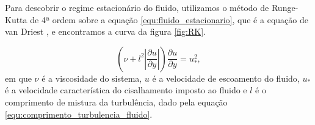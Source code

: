     Para descobrir o regime estacionário do fluido, utilizamos o método de Runge-Kutta de 4ª ordem sobre a equação \ref{equ:fluido_estacionario}, que é a equação de van Driest \cite{Numerical_simulation_of_turbulent_sediment_transport}, e encontramos a curva da figura \ref{fig:RK}.

\begin{equation}
    \label{equ:fluido_estacionario}
    \left(\nu+l^{2}\left|\frac{\partial u}{\partial y}\right|\right)\frac{\partial u}{\partial y} = u_{*}^{2},
\end{equation}
em que $\nu$ é a viscosidade do sistema, $u$ é a velocidade de escoamento do fluido, $u_{*}$ é a velocidade característica do cisalhamento imposto ao fluido e $l$ é o comprimento de mistura da turbulência, dado pela equação \ref{equ:comprimento_turbulencia_fluido}.

